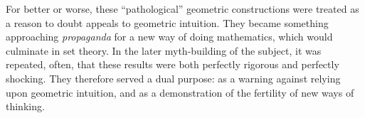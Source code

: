 \documentclass[../../../include/open-logic-section]{subfiles}
\begin{document}
For better or worse, these ``pathological'' geometric constructions
were treated as a reason to doubt appeals to geometric intuition. They
became something approaching \emph{propaganda} for a new way of doing
mathematics, which would culminate in set theory. In the later
myth-building of the subject, it was repeated, often, that these
results were both perfectly rigorous and perfectly shocking. They
therefore served a dual purpose: as a warning against relying upon
geometric intuition, and as a demonstration of the fertility of new
ways of thinking. 
\end{document}
